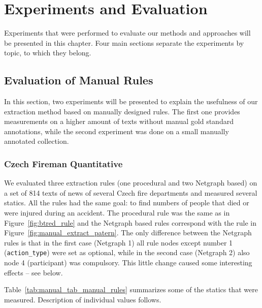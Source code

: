 \chapter{Experiments and Evaluation} \label{sec:ch_eval}

Experiments that were performed to evaluate our methods and approaches will be presented in this chapter. Four main sections separate the experiments by topic, to which they belong.

\section{Evaluation of Manual Rules} \graphicspath{{../img/ch50/}} \label{sec:manual_eval}


In this section, two experiments will be presented to explain the usefulness of our extraction method based on manually designed rules. 
The first one provides measurements on a higher amount of texts without manual gold standard annotations, while the second experiment was done on a small manually annotated collection. 

\subsection{Czech Fireman Quantitative} \label{sec:manual_quant_experiment}

We evaluated three extraction rules (one procedural and two Netgraph based) on a set of 814 texts of news of several Czech fire departments and measured several statics. All the rules had the same goal: to find numbers of people that died or were injured during an accident. The procedural rule was the same as in Figure~\ref{fig:btred_rule} and the Netgraph based rules correspond with the rule in Figure~\ref{fig:manual_extract_patern}. The only difference between the Netgraph rules is that in the first case (Netgraph 1) all rule nodes except number 1 (\verb+action_type+) were set as optional, while in the second case (Netgraph 2) also node 4 (participant) was compulsory. This little change caused some interesting effects -- see below. 

Table~\ref{tab:manual_tab_manual_rules} summarizes some of the statics that were measured. Description of individual values follows.

